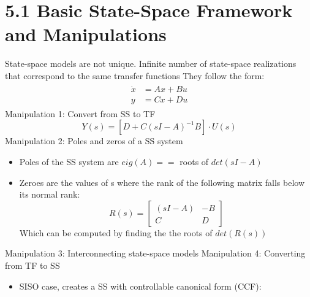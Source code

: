 \section*{5.1 Basic State-Space Framework and Manipulations}
State-space models are not unique. Infinite number of state-space realizations that correspond to the same transfer functions
They follow the form:
\begin{gather*}
    \begin{aligned}
        \dot{x} & = Ax + Bu \\
        y       & = Cx + Du
    \end{aligned}
\end{gather*}
Manipulation 1: Convert from SS to TF
\[
    Y(s) = [ D + C ( sI - A )^{-1} B ] \cdot U(s)
\]
Manipulation 2: Poles and zeros of a SS system
\begin{itemize}
    \item Poles of the SS system are \( eig(A) == \) roots of \( det( sI - A ) \)
    \item Zeroes are the values of s where the rank of the following matrix falls below its normal rank:
          \[
              R(s) = \begin{bmatrix}
                  (sI - A) & -B \\
                  C        & D
              \end{bmatrix}
          \]
          Which can be computed by finding the the roots of \( det( R(s) ) \)
\end{itemize}
Manipulation 3: Interconnecting state-space models
Manipulation 4: Converting from TF to SS
\begin{itemize}
    \item SISO case, creates a SS with controllable canonical form (CCF):
\end{itemize}
